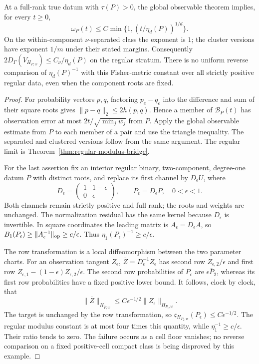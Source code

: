 \begin{proposition}
\label{prop:certificate-modulus}
At a full-rank true datum with $\tau(P)>0$, the global observable
theorem implies, for every $t\ge0$,
\begin{equation}\label{eq:eta-to-modulus}
 \omega_P(t)\le C\min\{1,(t/\eta_d(P))^{1/d}\}.
\end{equation}
On the within-component $\nu$-separated class the exponent is $1$;
the cluster versions have exponent $1/m$ under their stated margins.
Consequently $2D_\Gamma(V_{H_{P,w}})\le C_\nu/\eta_d(P)$ on the
regular stratum. There is no uniform reverse comparison of
$\eta_d(P)^{-1}$ with this Fisher-metric constant over all strictly
positive regular data, even when the component roots are fixed.
\end{proposition}
\begin{proof}
For probability vectors $p,q$, factoring $p_e-q_e$ into the difference
and sum of their square roots gives $\|p-q\|_2\le2h(p,q)$. Hence a
member of $\mathcal B_P(t)$ has observation error at most
$2t/\sqrt{\min_jw_j}$ from $P$. Apply the global observable estimate
from $P$ to each member of a pair and use the triangle inequality.
The separated and clustered versions follow from the same argument.
The regular limit is Theorem~\ref{thm:regular-modulus-bridge}.

For the last assertion fix an interior regular binary, two-component,
degree-one datum $\overline P$ with distinct roots, and replace its
first channel by $D_\epsilon\overline U$, where
\[
 D_\epsilon=\begin{pmatrix}1&1-\epsilon\\0&\epsilon\end{pmatrix},
 \qquad P_\epsilon=D_\epsilon\overline P,\quad 0<\epsilon<1.
\]
Both channels remain strictly positive and full rank; the roots and
weights are unchanged. The normalization residual has the same
kernel because $D_\epsilon$ is invertible. In square coordinates the
leading matrix is $A_\epsilon=D_\epsilon\overline A$, so
$B_1(P_\epsilon)\ge\|A_\epsilon^{-1}\|_{\mathrm{op}}\ge c/\epsilon$.
Thus $\eta_1(P_\epsilon)^{-1}\ge c/\epsilon$.

The row transformation is a local diffeomorphism between the two
parameter charts. For an observation tangent $Z_\epsilon$,
$\overline Z=D_\epsilon^{-1}Z_\epsilon$ has second row
$Z_{\epsilon,2}/\epsilon$ and first row
$Z_{\epsilon,1}-(1-\epsilon)Z_{\epsilon,2}/\epsilon$.
The second row probabilities of $P_\epsilon$ are
$\epsilon\overline P_2$, whereas its first row probabilities have a
fixed positive lower bound. It follows, clock by clock, that
\[
 \|\overline Z\|_{H_{\overline P,w}}
        \le C\epsilon^{-1/2}\|Z_\epsilon\|_{H_{P_\epsilon,w}}.
\]
The target is unchanged by the row transformation, so
$\mathfrak c_{H_{P_\epsilon,w}}(P_\epsilon)
\le C\epsilon^{-1/2}$. The regular modulus constant is at most four
times this quantity, while $\eta_1^{-1}\ge c/\epsilon$.
Their ratio tends to zero. The failure occurs as a cell floor vanishes;
no reverse comparison on a fixed positive-cell compact class is
being disproved by this example.
\end{proof}
